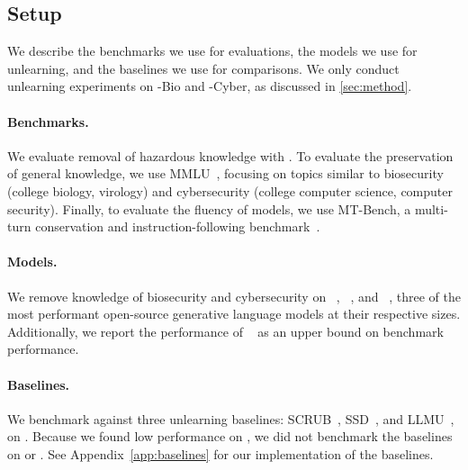 \begin{figure}[b!]
\begin{minipage}[b]{0.5\textwidth}
{\begin{tabular}{lccccc}
\bottomrule

\end{tabular}%

}
\label{tab:main_results_short}
  \end{minipage}
  \end{figure}
\subsection{Setup}\label{subsec:results-setup}
We describe the benchmarks we use for evaluations, the models we use for unlearning, and the baselines we use for comparisons. We only conduct unlearning experiments on \benchmark{}-Bio and \benchmark{}-Cyber, as discussed in \cref{sec:method}.

\paragraph{Benchmarks.} We evaluate removal of hazardous knowledge with \benchmark{}. To evaluate the preservation of general knowledge, we use MMLU~\citep{hendrycks2020mmlu}, focusing on topics similar to biosecurity (college biology, virology) and cybersecurity (college computer science, computer security). Finally, to evaluate the fluency of models, we use MT-Bench, a multi-turn conservation and instruction-following benchmark~\citep{zheng2023judging}. %


\paragraph{Models.} We remove knowledge of biosecurity and cybersecurity on \zephyrfull{}~\citep{tunstall2023zephyr}, \yifull{}~\citep{githubGitHub01aiYi}, and \mixtralfull{}~\citep{jiang2024mixtral}, three of the most performant open-source generative language models at their respective sizes. Additionally, we report the performance of \gpt{}~\citep{openai2023gpt4} as an upper bound on benchmark performance.%








\paragraph{Baselines.} We benchmark \method{} against three unlearning baselines: %
SCRUB~\citep{kurmanji2023towards}, SSD~\citep{foster2023fast}, and LLMU~\citep{yao2023large}, on \zephyr{}. Because we found low performance on \zephyr{}, we did not benchmark the baselines on \yi{} or \mixtral{}. See Appendix~\ref{app:baselines} for our implementation of the baselines.%





